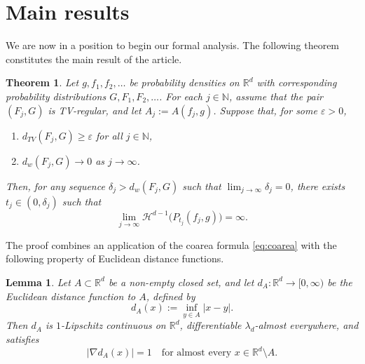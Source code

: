 \documentclass[12pt]{article}
\newtheorem{theorem}{Theorem}
\newtheorem{lemma}{Lemma}
\newcommand{\RR}{\mathbb{R}}
\newcommand{\NN}{\mathbb{N}}
\begin{document}
\section{Main results}\label{sec:main result}

We are now in a position to begin our formal analysis. The following theorem constitutes the main result of the article.

\begin{theorem}\label{thm:oscillations_high_dim_hausdorff}
Let $g, f_1, f_2, \dots$ be probability densities on $\RR^d$ with corresponding probability
distributions $G, F_1, F_2, \dots$. For each $j \in \NN$, assume that the pair $(F_j, G)$ is
TV-regular, and let $A_j := A(f_j,g)$. Suppose that, for some $\varepsilon>0$,
\begin{enumerate}
    \item[(i)] $d_{TV}(F_j, G) \geq \varepsilon$ for all $j \in \NN$,
    \item[(ii)] $d_w(F_j, G) \to 0$ as $j \to \infty$.
\end{enumerate}
Then, for any sequence $\delta_j > d_w(F_j, G)$ such that $\lim_{j \to \infty} \delta_j = 0$,
there exists  $t_j \in (0, \delta_j)$ such that
\begin{equation*}
\lim_{j \to \infty} \mathcal{H}^{d-1}\bigl(P_{t_j}(f_j,g)\bigr) = \infty.
\end{equation*}
\end{theorem}

The proof combines an application of the coarea formula \eqref{eq:coarea} with the following property of Euclidean
distance functions.

\begin{lemma}\label{lem:eikonal}
Let $A \subset \RR^d$ be a non-empty \emph{closed} set, and let $d_A: \RR^d \to [0,\infty)$ be
the Euclidean distance function to $A$, defined by
\begin{equation*}
d_A(x) := \inf_{y \in A} |x - y|.
\end{equation*}
Then $d_A$ is $1$-Lipschitz continuous on $\RR^d$, differentiable $\lambda_d$-almost everywhere, and satisfies
\begin{equation*}
|\nabla d_A(x)| = 1 \quad \text{for almost every } x \in \RR^d \setminus A.
\end{equation*}
\end{lemma}
\end{document}
